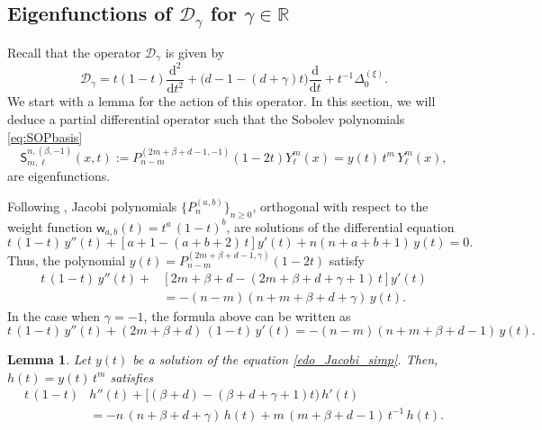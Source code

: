 \documentclass{amsart}
\newtheorem{lem}[thm]{Lemma}
\theoremstyle{remark}
\def\d{\mathrm{d}}
\def\sw{{\mathsf w}}
\def\sS{{\mathsf S}}
\def\b{{\beta}}
\def\g{{\gamma}}
\def\CD{{\mathcal D}}
\def\RR{{\mathbb R}}
\begin{document}
\subsection{Eigenfunctions of $\CD_{\g}$ for $\g \in \RR$}
 Recall that the operator $\CD_{\g}$ is given by
 $$
   \CD_{\g} =  t(1-t)\frac{\d^2}{\d t^2} + \big( d-1 - (d+\g)t \big) \frac{\d}{\d t}+ t^{-1} \Delta_0^{(\xi)}.
 $$
We start with a lemma for the action of this operator.
\iffalse
In this section, we will deduce a partial differential operator such that the Sobolev polynomials \eqref{eq:SOPbasis}
$$
  \sS_{m, \ell}^{n,(\b,-1)} (x,t) := P_{n-m}^{(2m + \b + d-1,-1)} (1-2t) Y_\ell^m (x) = y(t)\,t^m\,Y_\ell^m (x),
$$
are eigenfunctions.

Following \cite{X20}, Jacobi polynomials $\{P_n^{(a, b)}\}_{n\geqslant0}$, orthogonal with respect to the weight function $\sw_{a, b}(t) = t^a\,(1-t)^b$, are solutions of the differential equation
\begin{equation}\label{edo_Jacobi_gen}
t\,(1-t) \,y''(t) + [a +1-(a+b+2)\,t]y'(t) + n(n+a+b+1)\,y(t) = 0.
\end{equation}
Thus, the polynomial $y(t) = P_{n-m}^{(2m + \b + d-1,\gamma)} (1-2t)$ satisfy
\begin{equation}\label{edo_Jacobi_gamma}
\begin{aligned}
t\,(1-t) \,y''(t) + &[2m+\b +d-(2m+\b+d + \gamma + 1)\,t]y'(t) \\
& = -(n-m)(n + m +\b+d+ \gamma)\,y(t).
\end{aligned}
\end{equation}
In the case when $\gamma = -1$, the formula above can be written as
\begin{equation}\label{edo_Jacobi_simp}
t\,(1-t) \,y''(t) + (2m+\b +d)\,(1-t)\,y'(t) = -(n-m)(n + m +\b+d-1)\,y(t).
\end{equation}

\begin{lem}
Let $y(t)$ be a solution of the equation \eqref{edo_Jacobi_simp}. Then, $h(t) = y(t)\,t^m$ satisfies
\begin{align*}
t\,(1-t) & h''(t) + [(\b +d)-(\b+d+\g+1)t) \, h'(t) \\
& = - n\,(n + \b+d+\gamma)\,h(t) + m\,(m+\beta+d-1) \, t^{-1}\,h(t).
\end{align*}
\end{lem}
\end{document}
